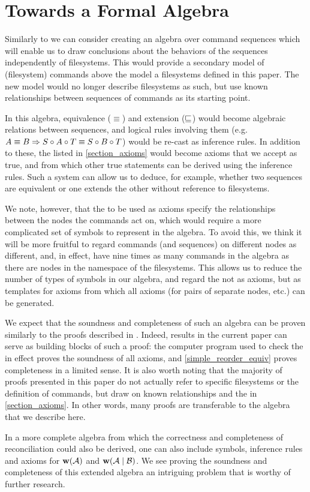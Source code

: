 
\section{Towards a Formal Algebra}\label{sec_algebra}

Similarly to \cite{NREC} we can consider creating an algebra over command sequences
which will enable us to draw conclusions about the behaviors of the sequences
independently of filesystems.
This would provide a secondary model of (filesystem) commands above the model a filesystems
defined in this paper. The new model would no longer describe filesystems as such,
but use known relationships between sequences of commands as its starting point.

In this algebra, equivalence ($\equiv$) and extension ($\sqsubseteq$) would become algebraic relations
between sequences, and logical rules involving them
(e.g. $ A\equiv B \Rightarrow S\circ A\circ T\equiv S\circ B\circ T $) would be re-cast as inference rules.
In addition to these, the  listed in \cref{section_axioms}
would become axioms that we accept as true, and from which other true statements can be derived
using the inference rules.
Such a system can allow us to deduce, for example, whether two sequences are equivalent
or one extends the other
without reference to filesystems.

We note, however, that the  to be used as axioms 
specify the relationships between the nodes
the commands act on, which would require a more complicated set of symbols to represent
in the algebra.
To avoid this, we think it will be more fruitful to regard commands (and sequences)
on different nodes as different, and, in effect, have nine times as many commands 
in the algebra as there are nodes in the namespace of the filesystems.
This allows us to reduce the number of types of symbols in our algebra, and regard
the  not as axioms, but as templates for axioms
from which all axioms (for pairs of separate nodes, etc.) can be generated.

We expect that the soundness and completeness of such an algebra can be proven
similarly to the proofs described in \cite{NREC}.
Indeed, results in the current paper can serve as building blocks of such a proof:
the computer program used to check the 
in effect proves the soundness of all axioms,
and \cref{simple_reorder_equiv} proves completeness in a limited sense.
It is also worth noting that the majority of proofs presented in this paper
do not actually refer to specific filesystems or the definition of commands,
but draw on known relationships and the
 in \cref{section_axioms}.
In other words, many proofs are transferable to the algebra that we describe here.

In a more complete algebra from which the correctness and completeness
of reconciliation could also be derived,
one can also include symbols, inference rules and axioms for 
$\mathbf{w}({\mathcal{A}})$ and $\mathbf{w}({\mathcal{A}}\mathrel{|}{\mathcal{B}})$.
We see proving the soundness and completeness of this extended algebra
an intriguing problem that is worthy of further research.
